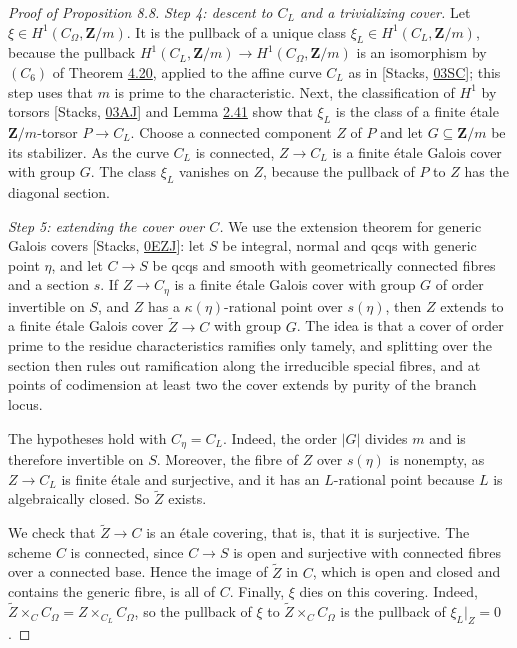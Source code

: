 \documentclass[11pt]{article}
\begin{document}
\begin{proof}[{Proof of Proposition 8.8}]
\emph{Step 4: descent to \(C_L\) and a trivializing cover.} Let \(\xi\in H^1(C_\Omega,\mathbf Z/m)\). It is the pullback of a unique class \(\xi_L\in H^1(C_L,\mathbf Z/m)\), because the pullback \(H^1(C_L,\mathbf Z/m)\to H^1(C_\Omega,\mathbf Z/m)\) is an isomorphism by \((C_6)\) of Theorem \hyperref[bp340]{4.20}, applied to the affine curve \(C_L\) as in [Stacks, \href{https://stacks.math.columbia.edu/tag/03SC}{03SC}]; this step uses that \(m\) is prime to the characteristic. Next, the classification of \(H^1\) by torsors [Stacks, \href{https://stacks.math.columbia.edu/tag/03AJ}{03AJ}] and Lemma \hyperref[bp123]{2.41} show that \(\xi_L\) is the class of a finite étale \(\mathbf Z/m\)-torsor \(P\to C_L\). Choose a connected component \(Z\) of \(P\) and let \(G\subseteq\mathbf Z/m\) be its stabilizer. As the curve \(C_L\) is connected, \(Z\to C_L\) is a finite étale Galois cover with group \(G\). The class \(\xi_L\) vanishes on \(Z\), because the pullback of \(P\) to \(Z\) has the diagonal section.

\emph{Step 5: extending the cover over \(C\).} We use the extension theorem for generic Galois covers [Stacks, \href{https://stacks.math.columbia.edu/tag/0EZJ}{0EZJ}]: let \(S\) be integral, normal and qcqs with generic point \(\eta\), and let \(C\to S\) be qcqs and smooth with geometrically connected fibres and a section \(s\). If \(Z\to C_\eta\) is a finite étale Galois cover with group \(G\) of order invertible on \(S\), and \(Z\) has a \(\kappa(\eta)\)-rational point over \(s(\eta)\), then \(Z\) extends to a finite étale Galois cover \(\widetilde Z\to C\) with group \(G\). The idea is that a cover of order prime to the residue characteristics ramifies only tamely, and splitting over the section then rules out ramification along the irreducible special fibres, and at points of codimension at least two the cover extends by purity of the branch locus.

The hypotheses hold with \(C_\eta=C_L\). Indeed, the order \(|G|\) divides \(m\) and is therefore invertible on \(S\). Moreover, the fibre of \(Z\) over \(s(\eta)\) is nonempty, as \(Z\to C_L\) is finite étale and surjective, and it has an \(L\)-rational point because \(L\) is algebraically closed. So \(\widetilde Z\) exists.

We check that \(\widetilde Z\to C\) is an étale covering, that is, that it is surjective. The scheme \(C\) is connected, since \(C\to S\) is open and surjective with connected fibres over a connected base. Hence the image of \(\widetilde Z\) in \(C\), which is open and closed and contains the generic fibre, is all of \(C\). Finally, \(\xi\) dies on this covering. Indeed, \(\widetilde Z\times_C C_\Omega=Z\times_{C_L}C_\Omega\), so the pullback of \(\xi\) to \(\widetilde Z\times_CC_\Omega\) is the pullback of \(\xi_L|_Z=0\).
\end{proof}
\end{document}
